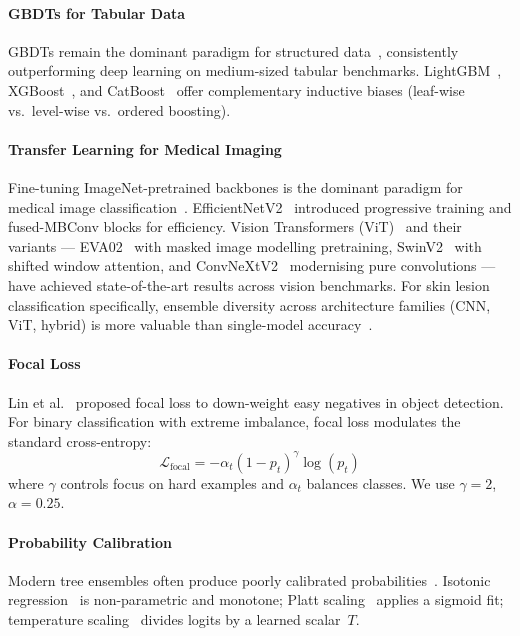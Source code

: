 \documentclass[conference]{IEEEtran}
\begin{document}
\paragraph{GBDTs for Tabular Data}
GBDTs remain the dominant paradigm for structured data~\cite{grinsztajn2022},
consistently outperforming deep learning on medium-sized tabular
benchmarks. LightGBM~\cite{ke2017lightgbm},
XGBoost~\cite{chen2016xgboost}, and CatBoost~\cite{prokhorenkova2018catboost}
offer complementary inductive biases (leaf-wise vs.~level-wise vs.~ordered
boosting).

\paragraph{Transfer Learning for Medical Imaging}
Fine-tuning ImageNet-pretrained backbones is the dominant paradigm for
medical image classification~\cite{russakovsky2015imagenet}.
EfficientNetV2~\cite{tan2021efficientnetv2} introduced progressive
training and fused-MBConv blocks for efficiency.
Vision Transformers (ViT)~\cite{dosovitskiy2021vit} and their variants
--- EVA02~\cite{fang2023eva02} with masked image modelling pretraining,
SwinV2~\cite{liu2022swinv2} with shifted window attention, and
ConvNeXtV2~\cite{woo2023convnextv2} modernising pure convolutions ---
have achieved state-of-the-art results across vision benchmarks.
For skin lesion classification specifically, ensemble diversity across
architecture families (CNN, ViT, hybrid) is more valuable than
single-model accuracy~\cite{cassidy2022analysis}.

\paragraph{Focal Loss}
Lin et al.~\cite{lin2017focal} proposed focal loss to down-weight
easy negatives in object detection.
For binary classification with extreme imbalance, focal loss modulates
the standard cross-entropy:
\begin{equation}
  \mathcal{L}_{\text{focal}} = -\alpha_t (1 - p_t)^\gamma \log(p_t)
  \label{eq:focal}
\end{equation}
where $\gamma$ controls focus on hard examples and $\alpha_t$ balances
classes. We use $\gamma{=}2$, $\alpha{=}0.25$.

\paragraph{Probability Calibration}
Modern tree ensembles often produce poorly calibrated
probabilities~\cite{niculescu2005}. Isotonic
regression~\cite{zadrozny2002} is non-parametric and monotone;
Platt scaling~\cite{platt1999} applies a sigmoid fit;
temperature scaling~\cite{guo2017} divides logits by a learned
scalar~$T$.
\end{document}
